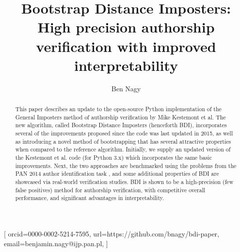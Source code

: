 \documentclass[
    hf
]{ceurart}
\begin{document}

\conference{}
\title{Bootstrap Distance Imposters: High precision authorship verification with improved interpretability}

\tnotemark[1]

\author[1]{Ben Nagy}[%
    orcid=0000-0002-5214-7595,
    url=https://github.com/bnagy/bdi-paper,
    email=benjamin.nagy@ijp.pan.pl,
]
\address[1]{Institute of Polish Language, Polish Academy of Sciences (IJP PAN)\\
    al. Mickiewicza 31\\
    Kraków, Poland}
\begin{abstract}
    This paper describes an update to the open-source Python implementation of the General Imposters
    method of authorship verification by Mike Kestemont et al. The new algorithm, called Bootstrap
    Distance Imposters (henceforth BDI), incorporates several of the improvements proposed since the
    code was last updated in 2015, as well as introducing a novel method of bootstrapping that has
    several attractive properties when compared to the reference algorithm. Initially, we supply an
    updated version of the Kestemont et al. code (for Python 3.x) which incorporates the same basic
    improvements. Next, the two approaches are benchmarked using the problems from the PAN 2014
    author identification task \cite{pan_2014}, and some additional properties of BDI are showcased
    via real-world verification studies. BDI is shown to be a high-precision (few false positives)
    method for authorship verification, with competitive overall performance, and significant
    advantages in interpretability.
\end{abstract}
\end{document}
